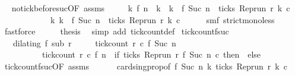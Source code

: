 \begin{isabellebody}
\ \isamarkupfalse%
\ no{\isacharunderscore}tick{\isacharunderscore}before{\isacharunderscore}suc{\isacharbrackleft}OF\ assms{\isacharbrackright}\ \isamarkupfalse%
\isanewline
\ \ \ \ {\isacartoucheopen}{\isacharbraceleft}k{\isachardot}\ f\ n\ {\isacharless}\ k\ {\isasymand}\ k\ {\isasymle}\ f\ {\isacharparenleft}Suc\ n{\isacharparenright}\ {\isasymand}\ ticks\ {\isacharparenleft}{\isacharparenleft}Rep{\isacharunderscore}run\ r{\isacharparenright}\ k\ c{\isacharparenright}{\isacharbraceright}\ {\isacharequal}\isanewline
\ \ \ \ \ \ \ \ \ \ \ \ {\isacharbraceleft}k{\isachardot}\ k\ {\isacharequal}\ f\ {\isacharparenleft}Suc\ n{\isacharparenright}\ {\isasymand}\ ticks\ {\isacharparenleft}{\isacharparenleft}Rep{\isacharunderscore}run\ r{\isacharparenright}\ k\ c{\isacharparenright}{\isacharbraceright}{\isacartoucheclose}\isanewline
\ \ \ \ \isamarkupfalse%
\ smf\ strict{\isacharunderscore}mono{\isacharunderscore}less\ \isamarkupfalse%
\ fastforce\isanewline
\ \ \isamarkupfalse%
\ \isamarkupfalse%
\ {\isacharquery}thesis\ \isamarkupfalse%
\ {\isacharparenleft}simp\ add{\isacharcolon}\ tick{\isacharunderscore}count{\isacharunderscore}def{\isacharparenright}\isanewline
{}\isamarkupfalse%
%
\endisatagproof
{\isafoldproof}%
%
\isadelimproof
\isanewline
%
\endisadelimproof
\isanewline
{}\isamarkupfalse%
\ tick{\isacharunderscore}count{\isacharunderscore}f{\isacharunderscore}suc{\isacharcolon}\isanewline
\ \ \ {\isacartoucheopen}dilating\ f\ sub\ r{\isacartoucheclose}\isanewline
\ \ \ \ \ {\isacartoucheopen}tick{\isacharunderscore}count\ r\ c\ {\isacharparenleft}f\ {\isacharparenleft}Suc\ n{\isacharparenright}{\isacharparenright}\isanewline
\ \ \ \ \ \ \ \ \ {\isacharequal}\ tick{\isacharunderscore}count\ r\ c\ {\isacharparenleft}f\ n{\isacharparenright}\ {\isacharplus}\ {\isacharparenleft}if\ ticks\ {\isacharparenleft}{\isacharparenleft}Rep{\isacharunderscore}run\ r{\isacharparenright}\ {\isacharparenleft}f\ {\isacharparenleft}Suc\ n{\isacharparenright}{\isacharparenright}\ c{\isacharparenright}\ then\ {}\ else\ {}{\isacharparenright}{\isacartoucheclose}\isanewline
%
\isadelimproof
%
\endisadelimproof
%
\isatagproof
{}\isamarkupfalse%
\ tick{\isacharunderscore}count{\isacharunderscore}fsuc{\isacharbrackleft}OF\ assms{\isacharbrackright}\isanewline
\ \ \ \ \ \ card{\isacharunderscore}sing{\isacharunderscore}prop{\isacharbrackleft}of\ {\isacartoucheopen}f\ {\isacharparenleft}Suc\ n{\isacharparenright}{\isacartoucheclose}\ {\isacartoucheopen}{\isasymlambda}k{\isachardot}\ ticks\ {\isacharparenleft}{\isacharparenleft}Rep{\isacharunderscore}run\ r{\isacharparenright}\ k\ c{\isacharparenright}{\isacartoucheclose}{\isacharbrackright}\ \isamarkupfalse%

\end{isabellebody}
